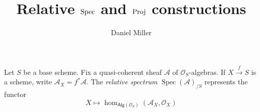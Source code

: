 \documentclass{article}
\title{Relative $\spec$ and $\operatorname{Proj}$ constructions}
\author{Daniel Miller}
\DeclareMathOperator{\spec}{Spec}
\newcommand{\sA}{\mathscr{A}}
\newcommand{\sO}{\mathscr{O}}
\newcommand{\alg}{\mathsf{Alg}}
\begin{document}
\maketitle





Let $S$ be a base scheme. Fix a quasi-coherent sheaf $\sA$ of 
$\sO_S$-algebras. If $X\xrightarrow f S$ is a scheme, write 
$\sA_X=f^\ast \sA$. The \emph{relative spectrum} $\spec(\sA)_{/S}$ represents 
the functor 
\[
	X\mapsto \hom_{\alg(\sO_S)}(\sA_X,\sO_X)
\]
\end{document}
